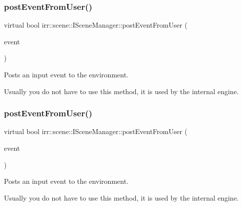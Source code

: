 \subsubsection{\texorpdfstring{post\+Event\+From\+User()}{postEventFromUser()}\hspace{0.1cm}{\footnotesize\ttfamily [1/2]}}
{\footnotesize\ttfamily virtual bool irr\+::scene\+::\+I\+Scene\+Manager\+::post\+Event\+From\+User (\begin{DoxyParamCaption}\item[{const \hyperlink{structirr_1_1SEvent}{S\+Event} \&}]{event }\end{DoxyParamCaption})\hspace{0.3cm}{\ttfamily [pure virtual]}}



Posts an input event to the environment. 

Usually you do not have to use this method, it is used by the internal engine. \mbox{\label{classirr_1_1scene_1_1ISceneManager_ac68aa8d654884f19ad52fa28f11db424}} 
\subsubsection{\texorpdfstring{post\+Event\+From\+User()}{postEventFromUser()}\hspace{0.1cm}{\footnotesize\ttfamily [2/2]}}
{\footnotesize\ttfamily virtual bool irr\+::scene\+::\+I\+Scene\+Manager\+::post\+Event\+From\+User (\begin{DoxyParamCaption}\item[{const \hyperlink{structirr_1_1SEvent}{S\+Event} \&}]{event }\end{DoxyParamCaption})\hspace{0.3cm}{\ttfamily [pure virtual]}}



Posts an input event to the environment. 

Usually you do not have to use this method, it is used by the internal engine. \mbox{\label{classirr_1_1scene_1_1ISceneManager_aaf17bdde6d4e9ef61a76f3b43100ecb8}} 
